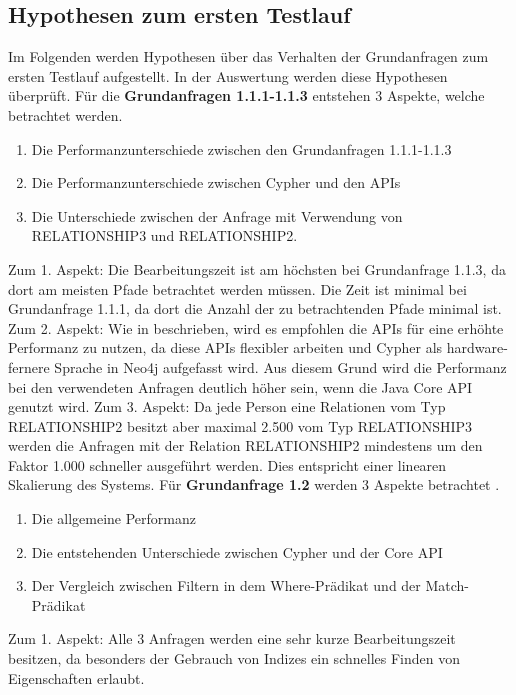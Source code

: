 \subsection{Hypothesen zum ersten Testlauf}
Im Folgenden werden Hypothesen über das Verhalten der Grundanfragen zum ersten Testlauf aufgestellt. In der Auswertung werden diese Hypothesen überprüft. \newline \newline
Für die \textbf{Grundanfragen 1.1.1-1.1.3} entstehen 3 Aspekte, welche betrachtet werden.
\begin{enumerate}
\item Die Performanzunterschiede zwischen den Grundanfragen 1.1.1-1.1.3
\item Die Performanzunterschiede zwischen Cypher und den APIs
\item Die Unterschiede zwischen der Anfrage mit Verwendung von RELATIONSHIP3 und RELATIONSHIP2.
\end{enumerate}
Zum 1. Aspekt: Die Bearbeitungszeit ist am höchsten bei Grundanfrage 1.1.3, da dort am meisten Pfade betrachtet werden müssen. Die Zeit ist minimal bei Grundanfrage 1.1.1, da dort die Anzahl der zu betrachtenden Pfade minimal ist. \newline
 Zum 2. Aspekt: Wie in \parencite{raj2015neo4j} beschrieben, wird es empfohlen die APIs für eine erhöhte Performanz zu nutzen, da diese APIs flexibler arbeiten und Cypher als hardware-fernere Sprache in Neo4j aufgefasst wird. Aus diesem Grund wird die Performanz bei den verwendeten Anfragen deutlich höher sein, wenn die Java Core API genutzt wird. \newline
Zum 3. Aspekt: Da jede Person eine Relationen vom Typ RELATIONSHIP2 besitzt aber maximal 2.500 vom Typ RELATIONSHIP3 werden die Anfragen mit der Relation RELATIONSHIP2 mindestens um den Faktor 1.000 schneller ausgeführt werden. Dies entspricht einer linearen Skalierung des Systems. \newline \newline
Für \textbf{Grundanfrage 1.2} werden 3 Aspekte betrachtet .
\begin{enumerate}
	\item Die allgemeine Performanz 
	\item Die entstehenden Unterschiede zwischen Cypher und der Core API
	\item Der Vergleich zwischen Filtern in dem Where-Prädikat und der Match-Prädikat
\end{enumerate}
Zum 1. Aspekt: Alle 3 Anfragen werden eine sehr kurze Bearbeitungszeit besitzen, da besonders der Gebrauch von Indizes ein schnelles Finden von Eigenschaften erlaubt. \newline
